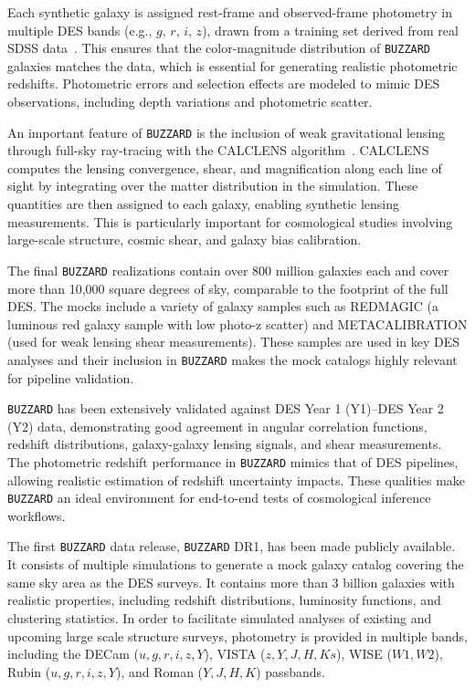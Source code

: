 Each synthetic galaxy is assigned rest-frame and observed-frame photometry in multiple \ac{DES} bands (e.g., $g$, $r$, $i$, $z$), drawn from a training set derived from real \ac{SDSS} data~\citep{DES:2019jmj}. This ensures that the color-magnitude distribution of \texttt{BUZZARD} galaxies matches the data, which is essential for generating realistic photometric redshifts. Photometric errors and selection effects are modeled to mimic \ac{DES} observations, including depth variations and photometric scatter.

An important feature of \texttt{BUZZARD} is the inclusion of weak gravitational lensing through full-sky ray-tracing with the CALCLENS algorithm~\citep{becker2013calclens}. CALCLENS computes the lensing convergence, shear, and magnification along each line of sight by integrating over the matter distribution in the simulation. These quantities are then assigned to each galaxy, enabling synthetic lensing measurements. This is particularly important for cosmological studies involving large-scale structure, cosmic shear, and galaxy bias calibration.

The final \texttt{BUZZARD} realizations contain over 800 million galaxies each and cover more than 10,000 square degrees of sky, comparable to the footprint of the full \ac{DES}. The mocks include a variety of galaxy samples such as REDMAGIC (a luminous red galaxy sample with low photo-z scatter) and METACALIBRATION (used for weak lensing shear measurements). These samples are used in key \ac{DES} analyses and their inclusion in \texttt{BUZZARD} makes the mock catalogs highly relevant for pipeline validation.

\texttt{BUZZARD} has been extensively validated against \ac{DES} Year 1 (Y1)--\ac{DES} Year 2 (Y2) data, demonstrating good agreement in angular correlation functions, redshift distributions, galaxy-galaxy lensing signals, and shear measurements. The photometric redshift performance in \texttt{BUZZARD} mimics that of \ac{DES} pipelines, allowing realistic estimation of redshift uncertainty impacts. These qualities make \texttt{BUZZARD} an ideal environment for end-to-end tests of cosmological inference workflows.

The first \texttt{BUZZARD} data release, \texttt{BUZZARD} DR1, has been made publicly available. It consists of multiple simulations to generate a mock galaxy catalog covering the same sky area as the \acf{DES} surveys. It contains more than 3 billion galaxies with realistic properties, including redshift distributions, luminosity functions, and clustering statistics. In order to facilitate simulated analyses of existing and upcoming large scale structure surveys, photometry is provided in multiple bands, including the DECam ($u,g,r,i,z,Y$), VISTA ($z,Y,J,H,Ks$), WISE ($W1,W2$), Rubin ($u,g,r,i,z,Y$), and Roman ($Y,J,H,K$) passbands.

